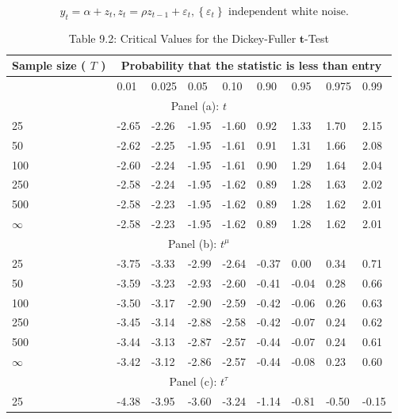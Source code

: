 \documentclass[10pt]{article}
\begin{document}
\begin{equation*}
y_{t}=\alpha+z_{t}, z_{t}=\rho z_{t-1}+\varepsilon_{t},\left\{\varepsilon_{t}\right\} \text { independent white noise. } \tag{9.3.10}
\end{equation*}


\begin{table}[h]
\begin{center}
\captionsetup{labelformat=empty}
\caption{Table 9.2: Critical Values for the Dickey-Fuller $\boldsymbol{t}$-Test}
\begin{tabular}{|l|l|l|l|l|l|l|l|l|}
\hline
\multirow{2}{*}{Sample size ( $T$ )} & \multicolumn{8}{|c|}{Probability that the statistic is less than entry} \\
\hline
 & 0.01 & 0.025 & 0.05 & 0.10 & 0.90 & 0.95 & 0.975 & 0.99 \\
\hline
\multicolumn{9}{|c|}{Panel (a): $t$} \\
\hline
25 & -2.65 & -2.26 & -1.95 & -1.60 & 0.92 & 1.33 & 1.70 & 2.15 \\
\hline
50 & -2.62 & -2.25 & -1.95 & -1.61 & 0.91 & 1.31 & 1.66 & 2.08 \\
\hline
100 & -2.60 & -2.24 & -1.95 & -1.61 & 0.90 & 1.29 & 1.64 & 2.04 \\
\hline
250 & -2.58 & -2.24 & -1.95 & -1.62 & 0.89 & 1.28 & 1.63 & 2.02 \\
\hline
500 & -2.58 & -2.23 & -1.95 & -1.62 & 0.89 & 1.28 & 1.62 & 2.01 \\
\hline
$\infty$ & -2.58 & -2.23 & -1.95 & -1.62 & 0.89 & 1.28 & 1.62 & 2.01 \\
\hline
\multicolumn{9}{|c|}{Panel (b): $t^{\mu}$} \\
\hline
25 & -3.75 & -3.33 & -2.99 & -2.64 & -0.37 & 0.00 & 0.34 & 0.71 \\
\hline
50 & -3.59 & -3.23 & -2.93 & -2.60 & -0.41 & -0.04 & 0.28 & 0.66 \\
\hline
100 & -3.50 & -3.17 & -2.90 & -2.59 & -0.42 & -0.06 & 0.26 & 0.63 \\
\hline
250 & -3.45 & -3.14 & -2.88 & -2.58 & -0.42 & -0.07 & 0.24 & 0.62 \\
\hline
500 & -3.44 & -3.13 & -2.87 & -2.57 & -0.44 & -0.07 & 0.24 & 0.61 \\
\hline
$\infty$ & -3.42 & -3.12 & -2.86 & -2.57 & -0.44 & -0.08 & 0.23 & 0.60 \\
\hline
\multicolumn{9}{|c|}{Panel (c): $t^{\tau}$} \\
\hline
25 & -4.38 & -3.95 & -3.60 & -3.24 & -1.14 & -0.81 & -0.50 & -0.15 \\

\end{tabular}
\end{center}
\end{table}
\end{document}
